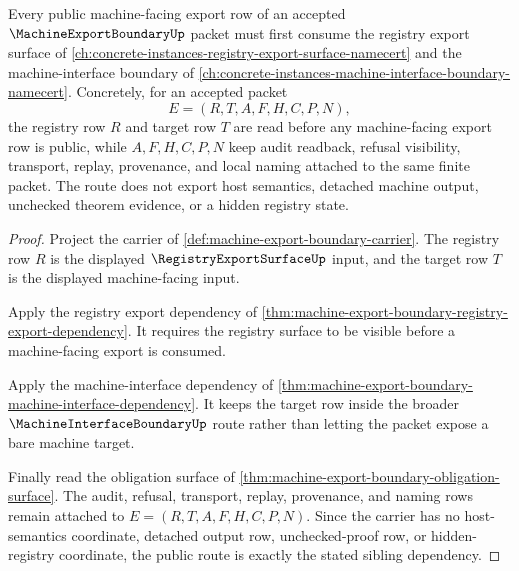 \begin{theorem}
\label{thm:machine-export-boundary-namecert-sibling-route}
Every public machine-facing export row of an accepted $\MachineExportBoundaryUp$ packet must first consume the registry export surface of \autoref{ch:concrete-instances-registry-export-surface-namecert} and the machine-interface boundary of \autoref{ch:concrete-instances-machine-interface-boundary-namecert}. Concretely, for an accepted packet
$$
E=(R,T,A,F,H,C,P,N),
$$
the registry row $R$ and target row $T$ are read before any machine-facing export row is public, while $A,F,H,C,P,N$ keep audit readback, refusal visibility, transport, replay, provenance, and local naming attached to the same finite packet. The route does not export host semantics, detached machine output, unchecked theorem evidence, or a hidden registry state.
\end{theorem}
\begin{proof}
Project the carrier of \autoref{def:machine-export-boundary-carrier}. The registry row $R$ is the displayed $\RegistryExportSurfaceUp$ input, and the target row $T$ is the displayed machine-facing input.

Apply the registry export dependency of \autoref{thm:machine-export-boundary-registry-export-dependency}. It requires the registry surface to be visible before a machine-facing export is consumed.

Apply the machine-interface dependency of \autoref{thm:machine-export-boundary-machine-interface-dependency}. It keeps the target row inside the broader $\MachineInterfaceBoundaryUp$ route rather than letting the packet expose a bare machine target.

Finally read the obligation surface of \autoref{thm:machine-export-boundary-obligation-surface}. The audit, refusal, transport, replay, provenance, and naming rows remain attached to $E=(R,T,A,F,H,C,P,N)$. Since the carrier has no host-semantics coordinate, detached output row, unchecked-proof row, or hidden-registry coordinate, the public route is exactly the stated sibling dependency.
\end{proof}
